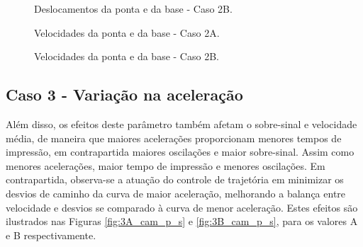 
\begin{figure}[H]
    \centering
    \hfill
    \caption{Deslocamentos da ponta e da base - Caso 2B.}
    \label{fig:2B_des}
\end{figure}


\begin{figure}[H]
    \centering
    \hfill
    \caption{Velocidades da ponta e da base - Caso 2A.}
    \label{fig:2A_vel}
\end{figure}


\begin{figure}[H]
    \centering
    \hfill
    \caption{Velocidades da ponta e da base - Caso 2B.}
    \label{fig:2B_vel}
\end{figure}



\subsection{Caso 3 - Variação na aceleração}


Além disso, os efeitos deste parâmetro também afetam o sobre-sinal e velocidade média, de maneira que maiores acelerações proporcionam menores tempos de impressão, em contrapartida maiores oscilações e maior sobre-sinal. Assim como menores acelerações, maior tempo de impressão e menores oscilações. Em contrapartida, observa-se a atuação do controle de trajetória em minimizar os desvios de caminho da curva de maior aceleração, melhorando a balança entre velocidade e desvios se comparado à curva de menor aceleração. Estes efeitos são ilustrados nas Figuras \ref{fig:3A_cam_p_s} e \ref{fig:3B_cam_p_s}, para os valores A e B respectivamente.


